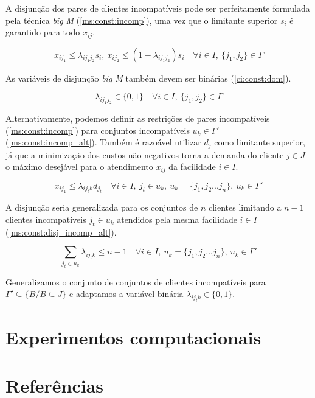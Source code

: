 \documentclass[]{article}
\begin{document}
	A disjunção dos pares de clientes incompatíveis pode ser perfeitamente formulada pela técnica \textit{big M} (\ref{ms:const:incomp}), 
	uma vez que o limitante superior $s_i$ é garantido para todo $x_{ij}$.
	
	\begin{equation}
		\label{ms:const:incomp}		
		x_{ij_1} \le \lambda_{ij_1j_2} s_i, 
		\ x_{ij_2} \le (1 - \lambda_{ij_1j_2}) s_i 
		\quad
		\forall i \in I, 
		\ \{ j_1, j_2 \} \in \Gamma  
	\end{equation}

    As variáveis de disjunção \textit{big M} também devem ser binárias (\ref{ci:const:dom}).

    \begin{equation}
		\label{ci:const:dom}		
		\lambda_{ij_1j_2} \in \{0, 1\}
		\quad
		\forall i \in I,  		
		\ \{ j_1, j_2 \} \in \Gamma
	\end{equation}

	Alternativamente, podemos definir as restrições de pares incompatíveis (\ref{ms:const:incomp}) para conjuntos incompatíveis $u_k \in \Gamma'$ (\ref{ms:const:incomp_alt}). 
	Também é razoável utilizar $d_j$ como limitante superior, 
	já que a minimização dos custos não-negativos torna a demanda do cliente $j \in J$ o máximo desejável para o atendimento $x_{ij}$ da facilidade $i \in I$.   
	
	\begin{equation}
		\label{ms:const:incomp_alt}		
		x_{ij_1} \le \lambda_{ij_tk} d_{j_t} 
		\quad
		\forall i \in I, 
		\ j_t \in u_k,
		\ u_k = \{ j_1, j_2 ... j_n \},
		\ u_k \in \Gamma'  
	\end{equation}
	
	A disjunção seria generalizada para os conjuntos de $n$ clientes limitando a $n-1$ clientes incompatíveis $j_t \in u_k$ atendidos pela mesma facilidade $i \in I$ (\ref{ms:const:disj_incomp_alt}). 
	
	\begin{equation}
		\label{ms:const:disj_incomp_alt}
		\sum_{j_t \in u_k} \lambda_{ij_tk} \le n - 1 
		\quad
		\forall i \in I, 
		\ u_k = \{ j_1, j_2 ... j_n \},
		\ u_k \in \Gamma'  
	\end{equation}

	Generalizamos o conjunto de conjuntos de clientes incompatíveis para $\Gamma' \subseteq \{ B / B \subseteq J \}$ e adaptamos a variável binária $\lambda_{ij_tk} \in \{0,1\}$. 
	 


	\section{Experimentos computacionais}
	
	\section{Referências}

\end{document}
